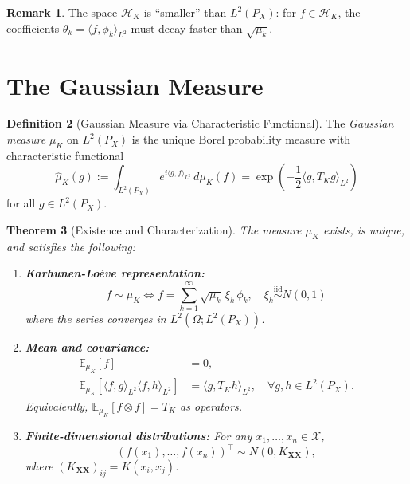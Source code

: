 \documentclass[11pt]{article}
\newtheorem{theorem}{Theorem}[section]
\theoremstyle{definition}
\newtheorem{definition}[theorem]{Definition}
\newtheorem{remark}[theorem]{Remark}
\newcommand{\HK}{\mathcal{H}_K}
\newcommand{\X}{\mathcal{X}}
\newcommand{\E}{\mathbb{E}}
\newcommand{\iid}{\stackrel{\mathrm{iid}}{\sim}}
\newcommand{\inprod}[2]{\langle #1, #2 \rangle}
\begin{document}
\begin{remark}
The space $\HK$ is ``smaller'' than $L^2(P_X)$: for $f \in \HK$, the coefficients $\theta_k = \inprod{f}{\phi_k}_{L^2}$ must decay faster than $\sqrt{\mu_k}$.
\end{remark}

\section{The Gaussian Measure}

\begin{definition}[Gaussian Measure via Characteristic Functional]
\label{def:gaussian-measure}
The \emph{Gaussian measure} $\mu_K$ on $L^2(P_X)$ is the unique Borel probability measure with characteristic functional
\begin{equation}
    \boxed{
    \hat{\mu}_K(g) := \int_{L^2(P_X)} e^{i\inprod{g}{f}_{L^2}} \, d\mu_K(f) = \exp\left( -\frac{1}{2} \inprod{g}{T_K g}_{L^2} \right)
    }
\end{equation}
for all $g \in L^2(P_X)$.
\end{definition}

\begin{theorem}[Existence and Characterization]
\label{thm:gaussian-existence}
The measure $\mu_K$ exists, is unique, and satisfies the following:

\begin{enumerate}[label=(\roman*)]
    \item \textbf{Karhunen-Lo\`eve representation:}
    \begin{equation}
        \boxed{
        f \sim \mu_K \iff f = \sum_{k=1}^\infty \sqrt{\mu_k} \, \xi_k \, \phi_k, \quad \xi_k \iid N(0,1)
        }
    \end{equation}
    where the series converges in $L^2(\Omega; L^2(P_X))$.
    
    \item \textbf{Mean and covariance:}
    \begin{align}
        \E_{\mu_K}[f] &= 0, \\
        \E_{\mu_K}[\inprod{f}{g}_{L^2} \inprod{f}{h}_{L^2}] &= \inprod{g}{T_K h}_{L^2}, \quad \forall g, h \in L^2(P_X).
    \end{align}
    Equivalently, $\E_{\mu_K}[f \otimes f] = T_K$ as operators.
    
    \item \textbf{Finite-dimensional distributions:} For any $x_1, \ldots, x_n \in \X$,
    \begin{equation}
        (f(x_1), \ldots, f(x_n))^\top \sim N(0, K_{\mathbf{X}\mathbf{X}}),
    \end{equation}
    where $(K_{\mathbf{X}\mathbf{X}})_{ij} = K(x_i, x_j)$.
\end{enumerate}
\end{theorem}
\end{document}
